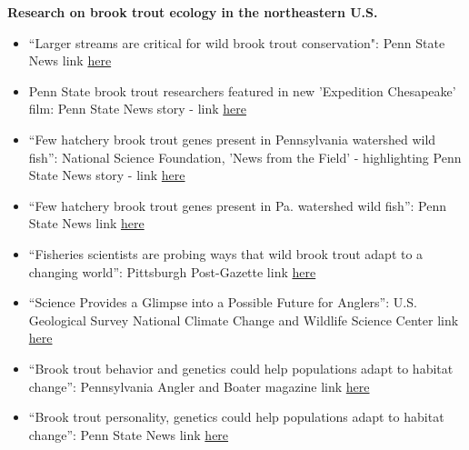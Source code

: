\documentclass[10pt]{article}
\begin{document}
\begin{flushleft}
\textbf{Research on brook trout ecology in the northeastern U.S.}\\
\begin{itemize}
	\item ``Larger streams are critical for wild brook trout conservation": Penn State News link \href{https://news.psu.edu/story/621981/2020/06/03/research/larger-streams-are-critical-wild-brook-trout-conservation}{here}
	   \item Penn State brook trout researchers featured in new 'Expedition Chesapeake' film: Penn State News story -  link \href{https://news.psu.edu/story/564133/2019/03/20/research/penn-state-brook-trout-researchers-featured-new-expedition}{here}
		\item  ``Few hatchery brook trout genes present in Pennsylvania watershed wild fish'': National Science Foundation, 'News from the Field' - highlighting Penn State News story - link \href{https://www.nsf.gov/news/news_summ.jsp?cntn_id=296716}{here}
	\item ``Few hatchery brook trout genes present in Pa. watershed wild fish'': Penn State News link \href{https://news.psu.edu/story/537280/2018/09/18/research/few-hatchery-brook-trout-genes-present-pa-watershed-wild-fish}{here}
\item ``Fisheries scientists are probing ways that wild brook trout adapt to a changing world'': Pittsburgh Post-Gazette link \href{http://www.post-gazette.com/sports/outdoors/2017/12/31/Fishery-scientists-are-probing-ways-that-wild-brook-trout-adapt-to-a-changing-world/stories/201712310280}{here}\\
\item ``Science Provides a Glimpse into a Possible Future for Anglers'': U.S. Geological Survey National Climate Change and Wildlife Science Center link
\href{https://nccwsc.usgs.gov/content/science-provides-glimpse-possible-future-anglers}{here}\\
\item ``Brook trout behavior and genetics could help populations adapt to habitat change'': Pennsylvania Angler and Boater magazine link
\href{http://www.fishandboat.com/Transact/AnglerBoater/AnglerBoater2017/MayJune/Documents/2017-0506mj-10brook.pdf}{here}\\
\item ``Brook trout personality, genetics could help populations adapt to habitat change'': Penn State News link 
\href{http://news.psu.edu/story/442050/2016/12/13/brook-trout-personality-genetics-could-help-populations-adapt-habitat-change}{here}\\

\end{itemize}
\end{flushleft}
\end{document}
